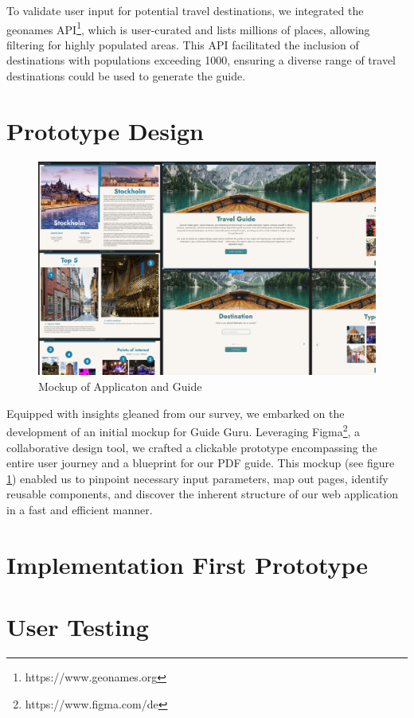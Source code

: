 \documentclass[english,notitlepage,smartquotes]{hgbreport}
\begin{document}
To validate user input for potential travel destinations, we integrated the geonames API\footnote{https://www.geonames.org}, which is user-curated and lists millions of places, allowing filtering for highly populated areas. This API facilitated the inclusion of destinations with populations exceeding 1000, ensuring a diverse range of travel destinations could be used to generate the guide.

\section{Prototype Design}

\begin{figure}
	\centering
	\includegraphics[width=1\textwidth]{Mockup_Example.png}
	\caption{Mockup of Applicaton and Guide}
	\label{fig1}
\end{figure}

Equipped with insights gleaned from our survey, we embarked on the development of an initial mockup for Guide Guru. Leveraging Figma\footnote{https://www.figma.com/de}, a collaborative design tool, we crafted a clickable prototype encompassing the entire user journey and a blueprint for our PDF guide. This mockup (see figure  \ref{fig1}) enabled us to pinpoint necessary input parameters, map out pages, identify reusable components, and discover the inherent structure of our web application in a fast and efficient manner.


\section{Implementation First Prototype}
 

\section{User Testing}
\end{document}
